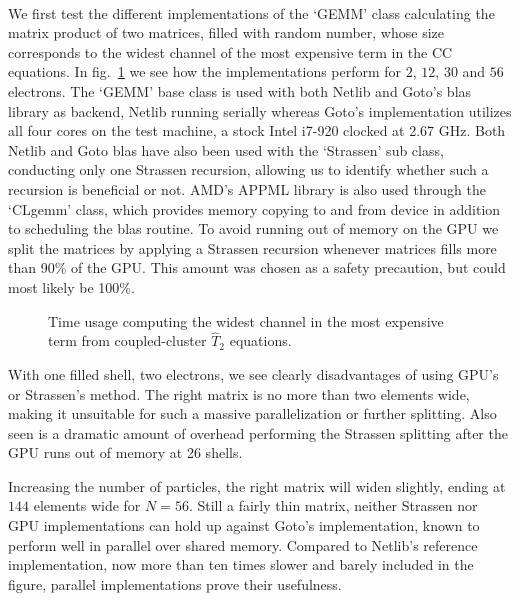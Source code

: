 \paragraph{}
We first test the different implementations of the `GEMM' class calculating the matrix product of two matrices, filled with random number, whose size corresponds to the widest channel of the most expensive term in the CC equations. 
In fig.~\ref{fig:results:timeMultCC} we see how the implementations perform for $2$, $12$, $30$ and $56$ electrons.
The `GEMM' base class is used with both Netlib and Goto's blas library as backend, Netlib running serially whereas Goto's implementation utilizes all four cores on the test machine, a stock Intel i7-920 clocked at 2.67 GHz.
Both Netlib and Goto blas have also been used with the `Strassen' sub class, conducting only one Strassen recursion, allowing us to identify whether such a recursion is beneficial or not.
AMD's APPML library is also used through the `CLgemm' class, which provides memory copying to and from device in addition to scheduling the blas routine.
To avoid running out of memory on the GPU we split the matrices by applying a Strassen recursion whenever matrices fills more than 90\% of the GPU.
This amount was chosen as a safety precaution, but could most likely be 100\%.
\begin{figure}
\begin{center}
\caption{Time usage computing the widest channel in the most expensive term from coupled-cluster $\hat{T}_2$ equations.}
\label{fig:results:timeMultCC}
\end{center}
\end{figure}

With one filled shell, two electrons, we see clearly disadvantages of using GPU's or Strassen's method.
The right matrix is no more than two elements wide, making it unsuitable for such a massive parallelization or further splitting.
Also seen is a dramatic amount of overhead performing the Strassen splitting after the GPU runs out of memory at 26 shells.

Increasing the number of particles, the right matrix will widen slightly, ending at $144$ elements wide for $N=56$.
Still a fairly thin matrix, neither Strassen nor GPU implementations can hold up against Goto's implementation, known to perform well in parallel over shared memory.
Compared to Netlib's reference implementation, now more than ten times slower and barely included in the figure, parallel implementations prove their usefulness.





